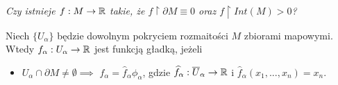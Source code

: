 \emph{Czy istnieje $f:M\to\mathbb{R}$ takie, że $f\restriction\partial M\equiv 0$ oraz $f\restriction Int(M)>0$?}

Niech $\{U_\alpha\}$ będzie dowolnym pokryciem rozmaitości $M$ zbiorami mapowymi. Wtedy $f_\alpha:U_\alpha\to\mathbb{R}$ jest funkcją gładką, jeżeli
\begin{itemize}
    \item $U_\alpha\cap\partial M\neq\emptyset\implies$ $f_\alpha=\hat{f}_\alpha\phi_\alpha$, gdzie $\widehat{f}_\alpha:\overline U_\alpha\to \mathbb{R}$ i $\hat{f}_\alpha(x_1,...,x_n)=x_n$.
\end{itemize}






